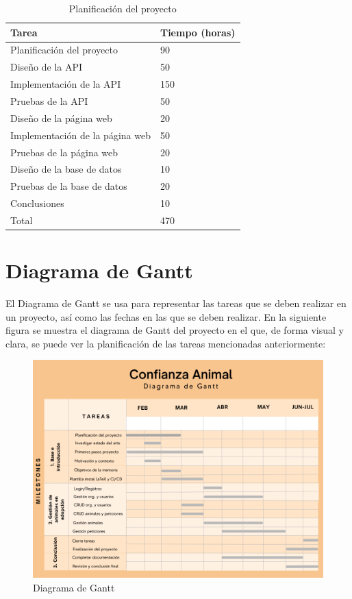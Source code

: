 \begin{table}[!ht]
  \centering
  \begin{tabular}{|l|l|}
    \hline
    \textbf{Tarea} & \textbf{Tiempo (horas)} \\
    \hline
    Planificación del proyecto & 90 \\
    Diseño de la API & 50 \\
    Implementación de la API & 150 \\
    Pruebas de la API & 50 \\
    Diseño de la página web & 20 \\
    Implementación de la página web & 50 \\
    Pruebas de la página web & 20 \\
    Diseño de la base de datos & 10 \\
    Pruebas de la base de datos & 20 \\
    Conclusiones & 10 \\
    \hline
    Total & 470 \\
    \hline
  \end{tabular}
  \caption{Planificación del proyecto}
  \label{tab:planificacion}
\end{table}

\newpage

\section{Diagrama de Gantt}\label{sec:diagrama-de-gantt}

El Diagrama de Gantt se usa para representar las tareas que se deben realizar en un proyecto, así como las fechas
en las que se deben realizar. En la siguiente figura se muestra el diagrama de Gantt del proyecto en el que, de forma
visual y clara, se puede ver la planificación de las tareas mencionadas anteriormente: \\

\begin{figure}[H]
    \centering
    \includegraphics[width=\textwidth]{imgs/gantt}
    \caption{Diagrama de Gantt}
    \label{fig:diagrama-gantt}
\end{figure}

